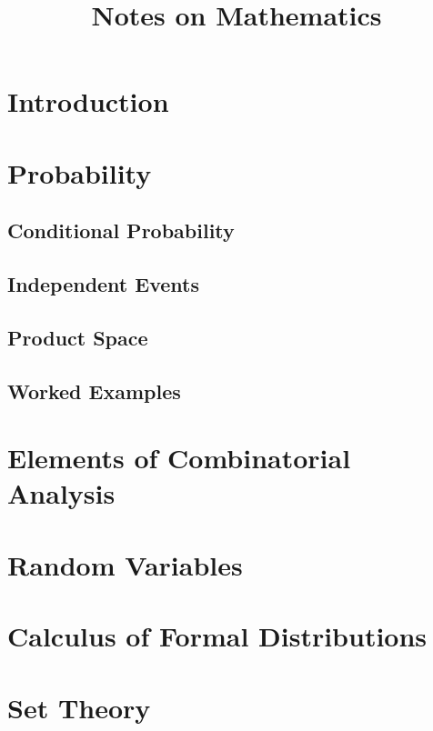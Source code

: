 \documentclass{article}
\title{Notes on Mathematics}
\begin{document}
\maketitle
\tableofcontents

\section{Introduction}


\section{Probability}

\subsection{Conditional Probability}

\subsection{Independent Events}

\subsection{Product Space} 


\subsection{Worked Examples}


\section{Elements of Combinatorial Analysis}


\section{Random Variables}


\section{Calculus of Formal Distributions}


\vfill\eject
\appendix
\section{Set Theory}


\end{document}

